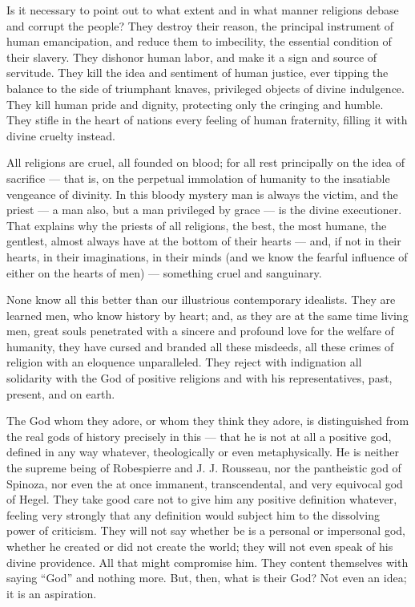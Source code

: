 \documentclass[12pt]{report}
\begin{document}
Is it necessary to point out to what extent and in what manner religions debase and corrupt the people? They destroy their reason, the principal instrument of human emancipation, and reduce them to imbecility, the essential condition of their slavery. They dishonor human labor, and make it a sign and source of servitude. They kill the idea and sentiment of human justice, ever tipping the balance to the side of triumphant knaves, privileged objects of divine indulgence. They kill human pride and dignity, protecting only the cringing and humble. They stifle in the heart of nations every feeling of human fraternity, filling it with divine cruelty instead.


All religions are cruel, all founded on blood; for all rest principally on the idea of sacrifice — that is, on the perpetual immolation of humanity to the insatiable vengeance of divinity. In this bloody mystery man is always the victim, and the priest — a man also, but a man privileged by grace — is the divine executioner. That explains why the priests of all religions, the best, the most humane, the gentlest, almost always have at the bottom of their hearts — and, if not in their hearts, in their imaginations, in their minds (and we know the fearful influence of either on the hearts of men) — something cruel and sanguinary.


None know all this better than our illustrious contemporary idealists. They are learned men, who know history by heart; and, as they are at the same time living men, great souls penetrated with a sincere and profound love for the welfare of humanity, they have cursed and branded all these misdeeds, all these crimes of religion with an eloquence unparalleled. They reject with indignation all solidarity with the God of positive religions and with his representatives, past, present, and on earth.


The God whom they adore, or whom they think they adore, is distinguished from the real gods of history precisely in this — that he is not at all a positive god, defined in any way whatever, theologically or even metaphysically. He is neither the supreme being of Robespierre and J. J. Rousseau, nor the pantheistic god of Spinoza, nor even the at once immanent, transcendental, and very equivocal god of Hegel. They take good care not to give him any positive definition whatever, feeling very strongly that any definition would subject him to the dissolving power of criticism. They will not say whether be is a personal or impersonal god, whether he created or did not create the world; they will not even speak of his divine providence. All that might compromise him. They content themselves with saying “God” and nothing more. But, then, what is their God? Not even an idea; it is an aspiration.
\end{document}
